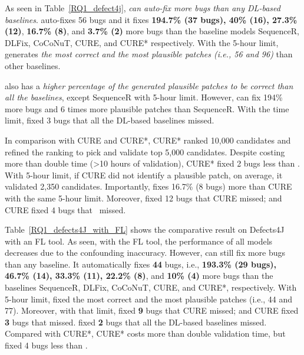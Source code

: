 As seen in Table~\ref{RQ1_defect4j}, {\em {\tool} can auto-fix more
  bugs than any DL-based baselines}. {\tool} auto-fixes 56 bugs and it
fixes {\bf 194.7\% (37 bugs), 40\% (16), 27.3\% (12)}, {\bf 16.7\%
  (8)}, and {\bf 3.7\% (2)} more bugs than the baseline models
SequenceR, DLFix, CoCoNuT, CURE, and CURE* respectively. With the
5-hour limit, {\tool} generates {\em the most correct and the most
  plausible patches (i.e., 56 and 96)} than other baselines.

{\tool} also has a {\em higher percentage of the generated plausible
  patches to be correct than all the baselines}, except SequenceR with
5-hour limit. However, {\tool} can fix 194\% more bugs and 6 times
more plausible patches than SequenceR. With the time limit, {\tool}
fixed 3 bugs that all the DL-based baselines missed.

In comparison with CURE and CURE*, CURE* ranked 10,000 candidates and
refined the ranking to pick and validate top 5,000 candidates. Despite
costing more than double time (>10 hours of validation), CURE* fixed 2
bugs less than {\tool}. With 5-hour limit, if CURE did not identify a
plausible patch, on average, it validated 2,350
candidates. Importantly, {\tool} fixes 16.7\% (8 bugs) more than CURE
with the same 5-hour limit. Moreover, {\tool} fixed 12 bugs that CURE
missed; and CURE fixed 4 bugs that {\tool}~missed.




Table~\ref{RQ1_defects4J_with_FL} shows the comparative result on
Defects4J with an FL tool. As seen, with the FL tool, the performance
of all models decreases due to the confounding inaccuracy. However,
{\tool} can still fix more bugs than any baseline. It automatically
fixes {\bf 44} bugs, i.e., {\bf 193.3\% (29 bugs), 46.7\% (14), 33.3\%
  (11), 22.2\% (8)}, and {\bf 10\% (4)} more bugs than the baselines
SequenceR, DLFix, CoCoNuT, CURE, and CURE*, respectively. With 5-hour
limit, {\tool} fixed the most correct and the most plausible patches
(i.e., 44 and 77). Moreover, with that limit, {\tool} fixed {\bf 9}
bugs that CURE missed; and CURE fixed {\bf 3} bugs that {\tool}
missed. {\tool} fixed {\bf 2} bugs that all the DL-based baselines
missed. Compared with CURE*, CURE* costs more than double validation
time, but fixed 4 bugs less than {\tool}.


